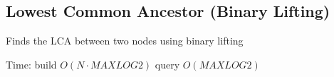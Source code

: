 \subsection{Lowest Common Ancestor (Binary Lifting)}

Finds the LCA between two nodes using binary lifting

Time: build $O(N \cdot MAXLOG2)$ query $O(MAXLOG2)$
